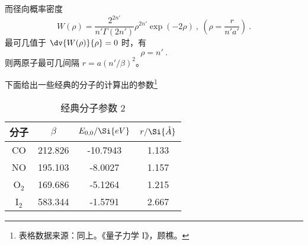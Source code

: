 而径向概率密度
\begin{equation}
W(\rho) = \frac{2^{2n'}}{n' \Gamma{(2n')}} \rho^{2n'} \exp(-2\rho) ~, \ \left(\rho = \frac{r}{n'a'}\right) ~.
\end{equation}
最可几值于 $\dv{W(\rho)}{\rho} = 0$ 时，有
\begin{equation}
\rho = n' ~.
\end{equation}
则两原子最可几间隔 $r = a (n'/\beta)^2$。

下面给出一些经典的分子的计算出的参数\footnote{表格数据来源：同上。《量子力学 I》，顾樵。}
\begin{table}[ht]
\centering
\caption{经典分子参数 2}\label{tab_kratPo2}
\begin{tabular}{|c|c|c|c|}
\hline
分子 & $\beta$ & $E_{0,0} / \Si{eV}$ & $r/\Si{\mathring{A}}$ \\
\hline
CO & 212.826 & -10.7943 & 1.133 \\
\hline
NO & 195.103 & -8.0027 & 1.157 \\
\hline
O$_2$ & 169.686 & -5.1264 & 1.215 \\
\hline
I$_2$ & 583.344 & -1.5791 & 2.667 \\
\hline
\end{tabular}
\end{table}
